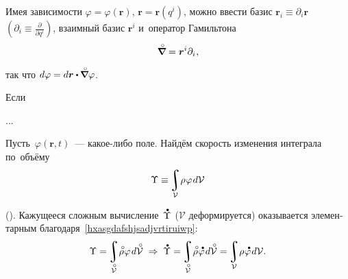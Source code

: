 \begin{otherlanguage}{russian}


\label{para:differentiation}

Имея зависимости ${\varphi \!=\! \varphi(\bm{r})}$, ${\bm{r} \!=\! \bm{r}(q^{i})}$, можно ввести базис ${\bm{r}_i \equiv \partial_i \bm{r}}$~${(\partial_i \equiv \frac{\partial}{\partial q^i})}$, взаимный базис ${\bm{r}^i}$ и~оператор Гамильтона
\vspace{-0.12em}\begin{equation}
\boldnablacircled = \bm{r}^i \partial_i \hspace{0.1ex},
\end{equation}

\vspace{-0.8em}\noindent так что ${d\varphi = d\bm{r} \dotp \hspace{-0.1ex} \boldnablacircled \varphi}$.

Если

...



Пусть~${\varphi(\bm{r},t)}$~--- какое\hbox{-}либо поле. Найдём скорость изменения интеграла по~объёму
\[ \Upsilon \equiv \hspace{-0.2ex} \integral\displaylimits_{\mathcal{V}} \! \rho \hspace{0.1ex} \varphi \hspace{0.2ex} d\mathcal{V} \]

\vspace{-0.25em}\noindent (). Кажущееся сложным вычисление~${\mathdotabove{\Upsilon}}$ ($\mathcal{V}$ деформируется) оказывается элементарным благодаря~\eqref{hxasgdafshjsadjvrtiruiwp}:
\begin{equation}\label{volumeintegralinbothconfigurations}
\Upsilon = \hspace{-0.2ex} \integral\displaylimits_{\mathcircabove{\mathcal{V}}} \! \mathcircabove{\rho} \hspace{0.1ex} \varphi \hspace{0.2ex} d\mathcircabove{\mathcal{V}} 
\;\Rightarrow\;
\mathdotabove{\Upsilon} = \hspace{-0.2ex} \integral\displaylimits_{\mathcircabove{\mathcal{V}}} \! \mathcircabove{\rho} \hspace{0.1ex} \mathdotabove{\varphi} \hspace{0.2ex} d\mathcircabove{\mathcal{V}} =
\hspace{-0.2ex} \integral\displaylimits_{\mathcal{V}} \! \rho \hspace{0.1ex} \mathdotabove{\varphi} \hspace{0.2ex} d\mathcal{V} .
\end{equation}


\end{otherlanguage}
